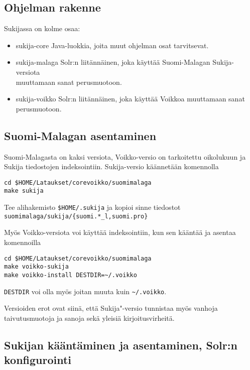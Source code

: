 \documentclass[12pt,a4paper]{scrartcl}
\begin{document}
\newpage
\subsection*{Ohjelman rakenne}

Sukijassa on kolme osaa:

\begin{itemize}
\item sukija-core     Java-luokkia, joita muut ohjelman osat tarvitsevat.
\item sukija-malaga   Solr:n liitännäinen, joka käyttää Suomi-Malagan
                      Sukija-versiota \\muuttamaan sanat perusmuotoon.
\item sukija-voikko   Solr:n liitännäinen, joka käyttää Voikkoa
                      muuttamaan sanat perusmuotoon.
\end{itemize}


\subsection*{Suomi-Malagan asentaminen}

Suomi-Malagasta on kaksi versiota, Voikko-versio on tarkoitettu
oikolukuun ja Sukija tiedostojen indeksointiin. Sukija-versio
käännetään komennolla

\begin{verbatim}
cd $HOME/Lataukset/corevoikko/suomimalaga
make sukija
\end{verbatim}

Tee alihakemisto \verb=$HOME/.sukija= ja kopioi sinne tiedostot \\
\verb=suomimalaga/sukija/{suomi.*_l,suomi.pro}=

Myös Voikko-versiota voi käyttää indeksointiin, kun sen kääntää ja
asentaa komennoilla

\begin{verbatim}
cd $HOME/Lataukset/corevoikko/suomimalaga
make voikko-sukija
make voikko-install DESTDIR=~/.voikko
\end{verbatim}

\verb|DESTDIR| voi olla myös joitan muuta kuin \verb|~/.voikko|.

Versioiden erot ovat siinä, että Sukija"-versio tunnistaa myös vanhoja
taivutusmuotoja ja sanoja sekä yleisiä kirjoitusvirheitä.


\subsection*{Sukijan kääntäminen ja asentaminen, Solr:n konfigurointi}
\end{document}
